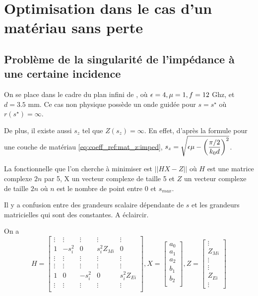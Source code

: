 \section{Optimisation dans le cas d'un matériau sans perte}

\subsection{Problème de la singularité de l'impédance à une certaine incidence}
On se place dans le cadre du plan infini de \cite{soudais_3d_2017}, où \(\epsilon=4,\mu=1,f=12\) Ghz, et \(d=3.5\) mm. Ce cas non physique possède un onde guidée pour \(s=s^\star\) où \(r(s^\star) = \infty\). 

De plus, il existe aussi \(s_z\) tel que \(Z(s_z) = \infty\). En effet, d'après la formule pour une couche de matériau \eqref{eq:coeff_ref:mat_z:imped}, \(s_z = \sqrt{\epsilon \mu - \left(\dfrac{\pi/2}{k_0 d}\right)^2}\).

La fonctionnelle que l'on cherche à minimiser est \(||H X - Z||\) où \(H\) est une matrice complexe \(2n\) par 5, X un vecteur complexe de taille 5 et \(Z\) un vecteur complexe de taille \(2n\) où \(n\) est le nombre de point entre 0 et \(s_{max}\). 

\begin{TODO}
  Il y a confusion entre des grandeurs scalaire dépendante de \(s\) et les grandeurs matricielles qui sont des constantes. A éclaircir.
\end{TODO}

On a 
\[
  H = \begin{bmatrix}
  \vdots & \vdots & \vdots & \vdots &\vdots \\
  1 & -s_i^2 & 0 & s_i^2 Z_{Mi} & 0 \\
  \vdots & \vdots & \vdots & \vdots &\vdots \\
  \vdots & \vdots & \vdots & \vdots &\vdots \\
  1 & 0 &-s_i^2 & 0 & s_i^2 Z_{Ei} \\
  \vdots & \vdots & \vdots & \vdots &\vdots \\
  \end{bmatrix},
  X = \begin{bmatrix}
  a_0\\
  a_1\\
  a_2\\
  b_1\\
  b_2\\
  \end{bmatrix},
  Z=\begin{bmatrix}
  \vdots\\
  Z_{Mi}\\
  \vdots\\
  \vdots\\
  Z_{Ei}\\
  \vdots
  \end{bmatrix}
\]

